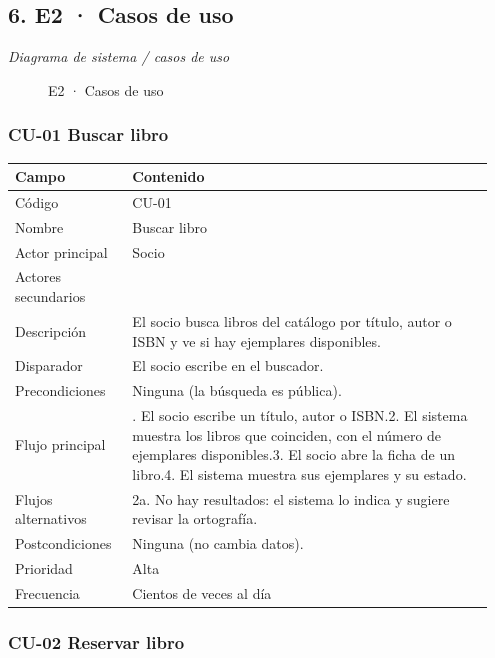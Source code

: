 \subsection*{6. E2 · Casos de uso}

\emph{Diagrama de sistema / casos de uso}

\begin{figure}[H]
\centering
{}
\caption{E2 · Casos de uso}
\end{figure}

\subsubsection*{CU-01 Buscar libro}

{\small
\begin{longtable}{@{}>{\raggedright\arraybackslash}p{0.233\linewidth}>{\raggedright\arraybackslash}p{0.716\linewidth}@{}}
\toprule
\textbf{Campo} & \textbf{Contenido} \\
\midrule
\endhead
Código & CU-01 \\
Nombre & Buscar libro \\
Actor principal & Socio \\
Actores secundarios &  \\
Descripción & El socio busca libros del catálogo por título, autor o ISBN y ve si hay ejemplares disponibles. \\
Disparador & El socio escribe en el buscador. \\
Precondiciones & Ninguna (la búsqueda es pública). \\
Flujo principal & 1. El socio escribe un título, autor o ISBN.\newline{}2. El sistema muestra los libros que coinciden, con el número de ejemplares disponibles.\newline{}3. El socio abre la ficha de un libro.\newline{}4. El sistema muestra sus ejemplares y su estado. \\
Flujos alternativos & 2a. No hay resultados: el sistema lo indica y sugiere revisar la ortografía. \\
Postcondiciones & Ninguna (no cambia datos). \\
Prioridad & Alta \\
Frecuencia & Cientos de veces al día \\
\bottomrule
\end{longtable}}

\subsubsection*{CU-02 Reservar libro}

